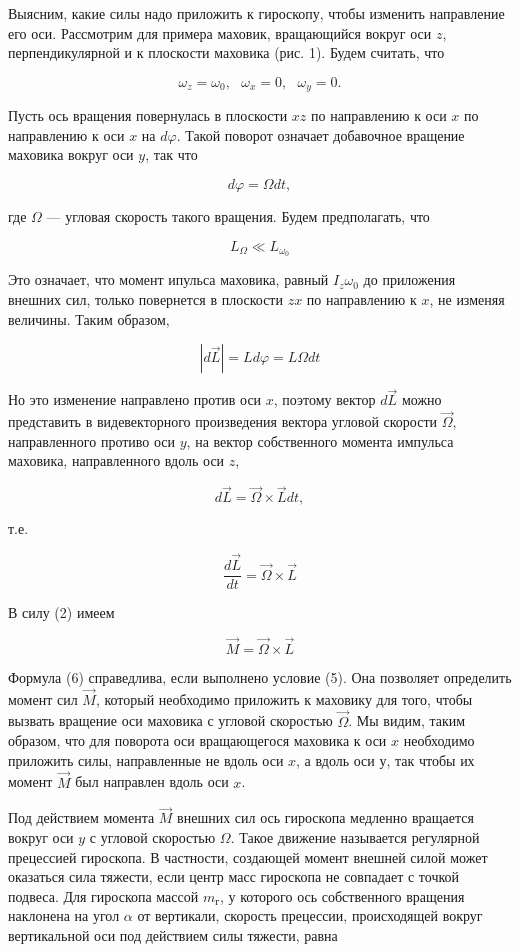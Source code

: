 \documentclass[14pt]{article}
\begin{document}
Выясним, какие силы надо приложить к гироскопу, чтобы изменить направление его оси. Рассмотрим для примера маховик, вращающийся вокруг оси $z$, перпендикулярной и к плоскости маховика (рис. 1). Будем считать, что

$$\omega_z = \omega_0, ~~~\omega_x = 0, ~~~\omega_y = 0.$$

\noindent Пусть ось вращения повернулась в плоскости $xz$ по направлению к оси $x$ по направлению к оси $x$ на $d\varphi$. Такой поворот означает добавочное вращение маховика вокруг оси $y$, так что 

$$d\varphi = \Omega dt,$$

\noindent где $\Omega$ --- угловая скорость такого вращения. Будем предполагать, что 

\begin{equation}
L_{\Omega} \ll L_{\omega_0}
\end{equation}

\noindent Это означает, что момент ипульса маховика, равный $I_z\omega_0$ до приложения внешних сил, только повернется в плоскости $zx$ по направлению к $x$, не изменяя величины. Таким образом,

$$|d\vec{L}| = Ld\varphi = L\Omega dt$$

\noindent Но это изменение направлено против оси $x$, поэтому вектор $d\vec{L}$ можно представить в видевекторного произведения вектора угловой скорости $\vec{\Omega}$, направленного противо оси $y$, на вектор собственного момента импульса маховика, направленного вдоль оси $z$,

$$d\vec{L} = \vec{\Omega} \times \vec{L}dt,$$

\noindent т.е.

$$\frac{d\vec{L}}{dt} = \vec{\Omega} \times \vec{L}$$

\noindent В силу (2) имеем

\begin{equation}
\vec{M} = \vec{\Omega} \times \vec{L}
\end{equation}

\noindent Формула (6) справедлива, если выполнено условие (5). Она позволяет определить момент сил $\vec{M}$, который необходимо приложить к маховику для того, чтобы вызвать вращение оси маховика с угловой скоростью $\vec{\Omega}$. Мы видим, таким образом, что для поворота оси вращающегося маховика к оси $x$ необходимо приложить силы, направленные не вдоль оси $x$, а вдоль оси у, так чтобы их момент $\vec{M}$ был направлен вдоль
оси $x$.

Под действием момента $\vec{M}$ внешних сил ось гироскопа медленно вращается вокруг оси $y$ с угловой скоростью $\Omega$. Такое движение называется регулярной прецессией гироскопа. В частности, создающей момент внешней силой может оказаться сила тяжести, если центр масс гироскопа не совпадает с точкой подвеса. Для гироскопа массой $m_{\text{г}}$, у которого ось собственного вращения наклонена на угол $\alpha$ от вертикали, скорость прецессии, происходящей вокруг вертикальной оси под действием силы тяжести, равна
\end{document}
